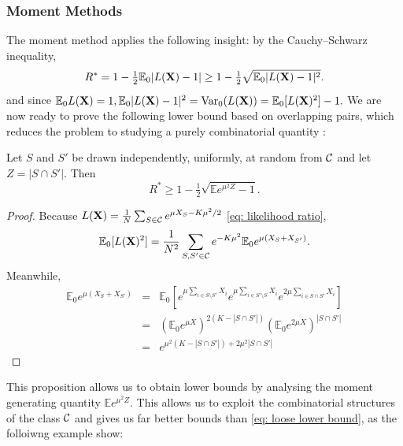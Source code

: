 \documentclass[10pt, oneside]{article}
\begin{document}
\subsubsection{Moment Methods}
\label{subsubsec:Moment Methods}
The moment method applies the following insight: by the Cauchy--Schwarz inequality,
$$R^* = 1 - \tfrac{1}{2} \mathbb{E}_0 |L(\mathbf{X})-1| \ge 1 - \tfrac{1}{2} \sqrt{\mathbb{E}_0 |L(\mathbf{X})-1|^2}.$$
and since $\mathbb{E}_0 L(\mathbf{X}) = 1, \mathbb{E}_0 |L(\mathbf{X})-1|^2=\operatorname{Var}_0(L(\mathbf{X})) = \mathbb{E}_0 [L(\mathbf{X})^2] -1.$ 
We are now ready to prove the following lower bound based on overlapping pairs, which reduces the problem to
studying a purely combinatorial quantity \cite{arias2008searching,addario2010combinatorial}:
\begin{prop}
  \label{prop:pairs}
  Let $S$ and $S'$ be drawn independently, uniformly, at random from ${\mathcal C}$
  and let $Z=|S\cap S'|$. Then
  \[
  R^* \ge 1- \tfrac{1}{2} \sqrt{\mathbb{E} e^{\mu^2 Z} -1}.
  \]
\end{prop}
\begin{proof}
Because $L(\mathbf{X})= \frac1 N \sum_{S\in{\mathcal C}} e^{\mu X_S -K\mu^2/2}$ \ref{eq: likelihood ratio}, 
\[
\mathbb{E}_0 [L(\mathbf{X})^2]=\frac{1}{N^2} \sum_{S,S'\in{\mathcal C}} e^{-K \mu^2} \mathbb{E}_0 e^{\mu(X_S+X_{S'})}.
\]
Meanwhile,
\begin{eqnarray*}
\mathbb{E}_0 e^{\mu(X_S+X_{S'})}
& = &
\mathbb{E}_0 [ e^{\mu\sum_{i\in S\setminus S'} X_i} e^{\mu\sum_{i\in
S'\setminus S} X_i}
e^{2\mu\sum_{i\in S\cap S'} X_i} ] \\
& = &
(\mathbb{E}_0 e^{\mu X} )^{2(K-|S\cap S'|)} (\mathbb{E}_0 e^{2\mu X}
)^{|S\cap S'|}
\\
& = &
e^{\mu^2 (K-|S\cap S'|)+2\mu^2|S\cap S'|}
\end{eqnarray*}
\end{proof}

This proposition allows us to obtain lower bounds by analysing the moment generating quantity $\mathbb{E} e^{\mu^2Z}$. 
This allows us to exploit the combinatorial structures of the class ${\mathcal C}$ and gives us far better bounds than \ref{eq: loose lower bound}, as the folloiwng example show:


\end{document}
